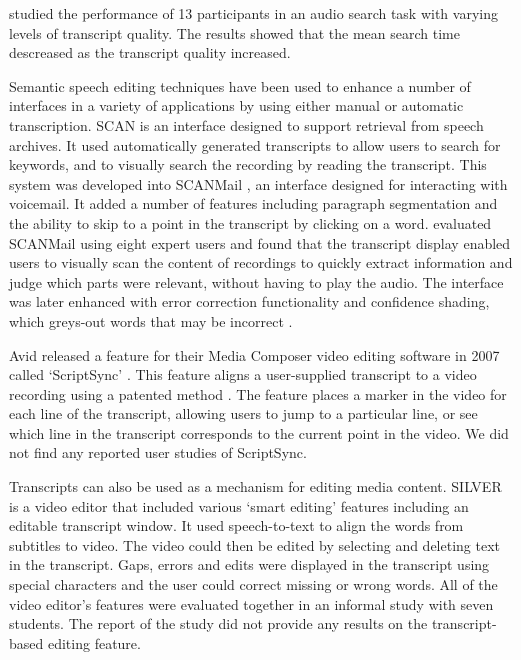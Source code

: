 \citet{Ranjan2006} studied the performance of 13 participants in an audio search task with varying levels of
transcript quality. The results showed that the mean search time descreased as the transcript quality increased.

Semantic speech editing techniques have been used to enhance a number of interfaces in a variety of applications by
using either manual or automatic transcription.
SCAN \citep{Whittaker1999} is an interface designed to support retrieval from speech archives. It used automatically
generated transcripts to allow users to search for keywords, and to visually search the recording by reading the
transcript. This system was developed into SCANMail \citep{Whittaker2002}, an interface designed for interacting with
voicemail. It added a number of features including paragraph segmentation and the ability to skip to a point in the
transcript by clicking on a word. \citet{Whittaker2002} evaluated SCANMail using eight expert users and found that the transcript display
enabled users to visually scan the content of recordings to quickly extract information and judge which parts were
relevant, without having to play the audio.  The interface was later enhanced with error correction functionality and
confidence shading, which greys-out words that may be incorrect \citep{Burke2006}.

Avid released a feature for their Media Composer video editing software in 2007 called `ScriptSync' \citep{Avid2011}.
This feature aligns a user-supplied transcript to a video recording using a patented method \citep{Griggs2007}. The
feature places a marker in the video for each line of the transcript, allowing users to jump to a particular line, or
see which line in the transcript corresponds to the current point in the video.  We did not find any reported user
studies of ScriptSync.

Transcripts can also be used as a mechanism for editing media content.  \mbox{SILVER} \citep{Casares2002, Long2003} is
a video editor that included various `smart editing' features including an editable transcript window. It used
speech-to-text to align the words from subtitles to video. The video could then be edited by selecting and deleting
text in the transcript. Gaps, errors and edits were displayed in the transcript using special characters and the user
could correct missing or wrong words. All of the video editor's features were evaluated together in an informal study
with seven students. The report of the study did not provide any results on the transcript-based editing feature.

